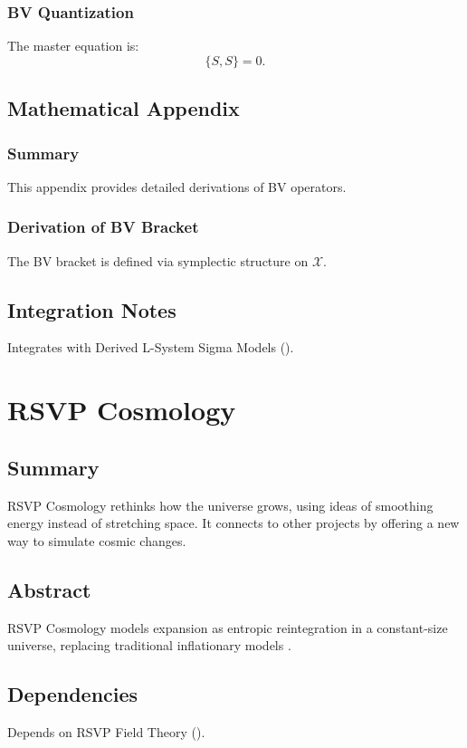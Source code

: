 \documentclass[11pt,oneside]{memoir}
\theoremstyle{plain}
\newcommand{\X}{\mathcal{X}}
\begin{document}
\subsection{BV Quantization}
The master equation is:
\begin{equation}
    \{S, S\} = 0.
\end{equation}

\section{Mathematical Appendix}
\subsection{Summary}
This appendix provides detailed derivations of BV operators.

\subsection{Derivation of BV Bracket}
The BV bracket is defined via symplectic structure on \(\X\).

\section{Integration Notes}
Integrates with Derived L-System Sigma Models ().

\chapter{RSVP Cosmology}
\label{sec:rsvp_cosmology}

\section{Summary}
RSVP Cosmology rethinks how the universe grows, using ideas of smoothing energy instead of stretching space. It connects to other projects by offering a new way to simulate cosmic changes.

\section{Abstract}
RSVP Cosmology models expansion as entropic reintegration in a constant-size universe, replacing traditional inflationary models \cite{evans}.

\section{Dependencies}
Depends on RSVP Field Theory ().
\end{document}
